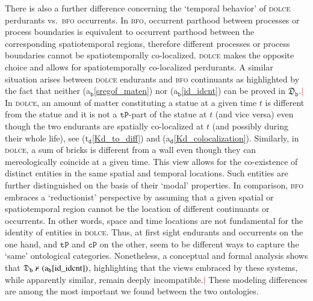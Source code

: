 \documentclass[ao]{iosart2x}
\newcommand{\nb}[1]{\textcolor{red}{$|$}\marginpar{\hspace*{-0cm}\parbox{20mm}{\scriptsize\raggedright\textcolor{red}{#1}}}}
\newcommand{\bfoAxLabel}{\textrm{a$_\texttt{b}$}}
\newcommand{\dolceAxLabel}{\textrm{a$_\texttt{d}$}}
\newcommand{\dolceThrLabel}{\textrm{t$_\texttt{d}$}}
\newcommand{\dbThrLabel}{\textrm{t$_\texttt{db}$}}
\newcommand{\refdolceax}[1]{({\dolceAxLabel}\ref{#1})}
\newcommand{\refdolceth}[1]{({\dolceThrLabel}\ref{#1})}
\newcommand{\refbfoax}[1]{({\bfoAxLabel}\ref{#1})}
\newcommand{\refdbth}[1]{({\dbThrLabel}\ref{#1})}
\newcommand{\pr}[1]{\mathtt{#1}}
\newcommand{\dolce}{{\textsc{dolce}}}
\newcommand{\bfo}{{\textsc{bfo}}}
\newcommand {\thdolcedbmap} {\ensuremath{\mathfrak{D}_\texttt{b}}}
\newcommand {\TPd} {\ensuremath{\pr{tP}}}
\newcommand{\bfocpart}{\pr{cP}}
\newcommand{\bfostregof}{\pr{STREG}}
\begin{document}
There is also a further difference concerning the `temporal behavior' of {\dolce} perdurants vs.~{\bfo} occurrents. %
In {\bfo}, occurrent parthood between processes or process boundaries is equivalent to occurrent parthood between the corresponding spatiotemporal regions, therefore different processes or process boundaries cannot be spatiotemporally co-localized. %
{\dolce} makes the opposite choice and allows for spatiotemporally co-localized perdurants. A similar situation arises between {\dolce} endurants and {\bfo} continuants as highlighted by the fact that neither \refbfoax{sregof_maten} nor \refbfoax{id_idcnt} can be proved in $\thdolcedbmap$.\nb{SB: era scritto "both ... cannot...."}
In {\dolce}, an amount of matter constituting a statue at a given time $t$ is different from the statue and it is not a $\TPd$-part of the statue at $t$ (and vice versa) even though the two endurants are spatially co-localized at $t$ (and possibly during their whole life), see \refdolceth{Kd_to_diff} and \refdolceax{Kd_colocalization}. Similarly, in {\dolce}, a sum of bricks is different from a wall even though they can mereologically coincide at a given time.
This view allows for the co-existence of distinct entities in the same spatial and temporal locations. Such entities are further distinguished on the basis of their `modal' properties. In comparison, {\bfo} embraces a `reductionist' perspective by assuming that a given spatial or spatiotemporal region cannot be the location of different continuants or occurrents. In other words, space and time locations are not fundamental for the identity of entities in {\dolce}. %
Thus, at first sight endurants and occurrents on the one hand, and $\TPd$ and $\bfocpart$ on the other, seem to be different ways to capture the `same' ontological categories. Nonetheless, a conceptual and formal analysis shows that ${\thdolcedbmap \nvdash \refbfoax{id_idcnt}}$, highlighting that the views embraced by these systems, while apparently similar, remain deeply incompatible.\nb{SB: spero di non aver enfatizzato troppo} These modeling differences are among the most important we found between the two ontologies. 
\end{document}
